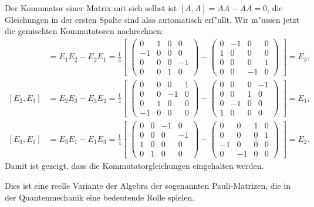 \begin{loesung}
Der Kommuator einer Matrix mit sich selbst ist $[A,A]=AA-AA=0$, die
Gleichungen in der ersten Spalte sind also automatisch erf"ullt.
Wir m"ussen jetzt die gemischten Kommutatoren nachrechnen:
\begin{align*}
[E_1,E_2]&=E_1E_2-E_2E_1=\frac14\left[\;
\begin{pmatrix}
 0& 1& 0& 0\\
-1& 0& 0& 0\\
 0& 0& 0&-1\\
 0& 0& 1& 0
\end{pmatrix}
-
\begin{pmatrix}
 0&-1& 0& 0\\
 1& 0& 0& 0\\
 0& 0& 0& 1\\
 0& 0&-1& 0
\end{pmatrix}\;
\right]
=E_3,
\\
[E_2,E_3]&=E_2E_3-E_3E_2=\frac14\left[\;
\begin{pmatrix}
 0& 0& 0& 1\\
 0& 0&-1& 0\\
 0& 1& 0& 0\\
-1& 0& 0& 0
\end{pmatrix}
-
\begin{pmatrix}
 0& 0& 0&-1\\
 0& 0& 1& 0\\
 0&-1& 0& 0\\
 1& 0& 0& 0
\end{pmatrix}\;
\right]
=E_1,
\\
[E_3,E_1]&=E_3E_1-E_1E_3=\frac14\left[\;
\begin{pmatrix}
 0& 0&-1& 0\\
 0& 0& 0&-1\\
 1& 0& 0& 0\\
 0& 1& 0& 0
\end{pmatrix}
-
\begin{pmatrix}
 0& 0& 1& 0\\
 0& 0& 0& 1\\
-1& 0& 0& 0\\
 0&-1& 0& 0
\end{pmatrix}\;
\right]
=E_2.
\end{align*}
Damit ist gezeigt, dass die Kommutatorgleichungen eingehalten werden.
\end{loesung}

\begin{diskussion}
Dies ist eine reelle Variante der Algebra der sogenannten Pauli-Matrizen,
die in der Quantenmechanik eine bedeutende Rolle spielen.
\end{diskussion}
